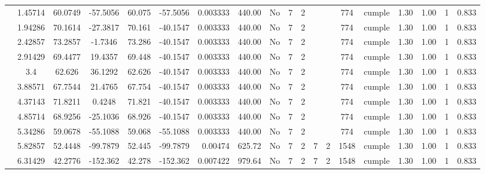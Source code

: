 \begin{table}[H]
{\begin{tabular}{|c|c|c|c|c|c|r|c|c|c|c|c|c|c|c|c|c|c|c|}
\cline{2-19}        & 1.45714 & 60.0749 & -57.5056 & 60.075 & -57.5056 & 0.003333 & 440.00 & No  & 7   & 2   &     &     & 774 & \cellcolor[rgb]{ .776,  .937,  .808}cumple & 1.30 & 1.00 & 1   & 0.833 \bigstrut\\
\cline{2-19}        & 1.94286 & 70.1614 & -27.3817 & 70.161 & -40.1547 & 0.003333 & 440.00 & No  & 7   & 2   &     &     & 774 & \cellcolor[rgb]{ .776,  .937,  .808}cumple & 1.30 & 1.00 & 1   & 0.833 \bigstrut\\
\cline{2-19}        & 2.42857 & 73.2857 & -1.7346 & 73.286 & -40.1547 & 0.003333 & 440.00 & No  & 7   & 2   &     &     & 774 & \cellcolor[rgb]{ .776,  .937,  .808}cumple & 1.30 & 1.00 & 1   & 0.833 \bigstrut\\
\cline{2-19}        & 2.91429 & 69.4477 & 19.4357 & 69.448 & -40.1547 & 0.003333 & 440.00 & No  & 7   & 2   &     &     & 774 & \cellcolor[rgb]{ .776,  .937,  .808}cumple & 1.30 & 1.00 & 1   & 0.833 \bigstrut\\
\cline{2-19}        & 3.4 & 62.626 & 36.1292 & 62.626 & -40.1547 & 0.003333 & 440.00 & No  & 7   & 2   &     &     & 774 & \cellcolor[rgb]{ .776,  .937,  .808}cumple & 1.30 & 1.00 & 1   & 0.833 \bigstrut\\
\cline{2-19}        & 3.88571 & 67.7544 & 21.4765 & 67.754 & -40.1547 & 0.003333 & 440.00 & No  & 7   & 2   &     &     & 774 & \cellcolor[rgb]{ .776,  .937,  .808}cumple & 1.30 & 1.00 & 1   & 0.833 \bigstrut\\
\cline{2-19}        & 4.37143 & 71.8211 & 0.4248 & 71.821 & -40.1547 & 0.003333 & 440.00 & No  & 7   & 2   &     &     & 774 & \cellcolor[rgb]{ .776,  .937,  .808}cumple & 1.30 & 1.00 & 1   & 0.833 \bigstrut\\
\cline{2-19}        & 4.85714 & 68.9256 & -25.1036 & 68.926 & -40.1547 & 0.003333 & 440.00 & No  & 7   & 2   &     &     & 774 & \cellcolor[rgb]{ .776,  .937,  .808}cumple & 1.30 & 1.00 & 1   & 0.833 \bigstrut\\
\cline{2-19}        & 5.34286 & 59.0678 & -55.1088 & 59.068 & -55.1088 & 0.003333 & 440.00 & No  & 7   & 2   &     &     & 774 & \cellcolor[rgb]{ .776,  .937,  .808}cumple & 1.30 & 1.00 & 1   & 0.833 \bigstrut\\
\cline{2-19}        & 5.82857 & 52.4448 & -99.7879 & 52.445 & -99.7879 & 0.00474 & 625.72 & No  & 7   & 2   & 7   & 2   & 1548 & \cellcolor[rgb]{ .776,  .937,  .808}cumple & 1.30 & 1.00 & 1   & 0.833 \bigstrut\\
\cline{2-19}        & 6.31429 & 42.2776 & -152.362 & 42.278 & -152.362 & 0.007422 & 979.64 & No  & 7   & 2   & 7   & 2   & 1548 & \cellcolor[rgb]{ .776,  .937,  .808}cumple & 1.30 & 1.00 & 1   & 0.833 \bigstrut\\

\end{tabular}}
\end{table}
